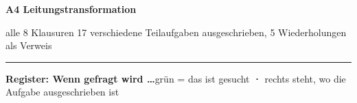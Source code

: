 \documentclass[a4paper,10pt]{article}
\begin{document}
\par\vspace*{-3mm}{\color{A4Farbe}\rule{\textwidth}{2.5pt}}\par\vspace{1.5mm}
{\sffamily\bfseries\huge\color{A4Farbe} A4 \textendash{} Leitungstransformation}\par\vspace{1mm}
{\sffamily\color{Grau} alle 8 Klausuren \textendash{} 17 verschiedene Teilaufgaben ausgeschrieben, 5 Wiederholungen als Verweis}\par\vspace{2mm}
{\color{A4Farbe}\rule{\textwidth}{0.8pt}}\par\vspace{4mm}
{\sffamily\bfseries Register: Wenn gefragt wird \ldots}\hfill{\footnotesize\color{Grau}\colorbox{MarkerG!45}{grün} = das ist gesucht \textbf{·} rechts steht, wo die Aufgabe ausgeschrieben ist}\par\vspace{1.5mm}
\renewcommand{\arraystretch}{1.12}\footnotesize
\end{document}
